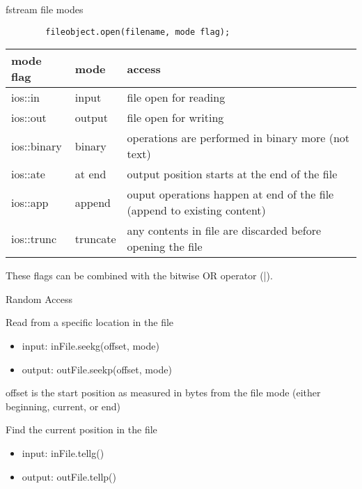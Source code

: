 \documentclass[xcolor={dvipsnames}]{beamer}
\begin{document}
\begin{frame}[fragile]{fstream file modes}
	\begin{center}
	\begin{verbatim}
		fileobject.open(filename, mode flag);
	\end{verbatim}
	\end{center}
\begin{table}
\begin{tabular}{|l|l|p{5cm}|}
	\hline
	\textbf{mode flag} & \textbf{mode} & {access}\\
	\hline
	ios::in & input & file open for reading \\
	\hline
	ios::out & output & file open for writing\\
	\hline
	ios::binary & binary & operations are performed in binary more (not text)\\
	\hline
	ios::ate & at end & output position starts at the end of the file \\
	\hline
	ios::app & append & ouput operations happen at end of the file (append to existing content)\\
	\hline
	ios::trunc & truncate & any contents in file are discarded before opening the file\\
	\hline
\end{tabular}
\end{table}
These flags can be combined with the bitwise OR operator (|).
\end{frame}

\begin{frame}{Random Access}
	\begin{block}{Read from a specific location in the file}
			\begin{itemize}
				\item input: inFile.seekg(offset, mode)
				\item output: outFile.seekp(offset, mode)
			\end{itemize}
		offset is the start position as measured in bytes from the file mode (either beginning, current, or end)
	\end{block}
	\begin{block}{Find the current position in the file}
			\begin{itemize}
				\item input: inFile.tellg()
				\item output: outFile.tellp()
			\end{itemize}
	\end{block}
\end{frame}
\end{document}
